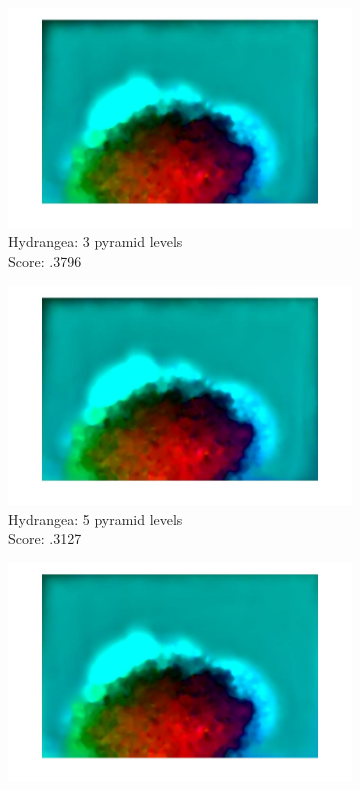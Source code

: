 \documentclass[10pt,twocolumn,letterpaper]{article}
\begin{document}
\begin{figure}[t]
	\centering
	\begin{subfigure}[b]{0.3\textwidth}
		\centering
		\includegraphics[width=\textwidth] {hydragea_3levels.jpg}
		\caption{Hydrangea: 3 pyramid levels \\ Score: .3796}
		\label{fig:hydrangea3}
	\end{subfigure}\hfill
	\begin{subfigure}[b]{0.3\textwidth}
		\centering
		\includegraphics[width=\textwidth] {hydragea_5levels.jpg} 
		\caption{Hydrangea: 5 pyramid levels \\ Score: .3127}
		\label{fig:hydrangea5}
	\end{subfigure}\hfill
	\begin{subfigure}[b]{0.3\textwidth}
		\centering
		\includegraphics[width=\textwidth] {hydragea_6levels.jpg} 

\end{subfigure}
\end{figure}
\end{document}
